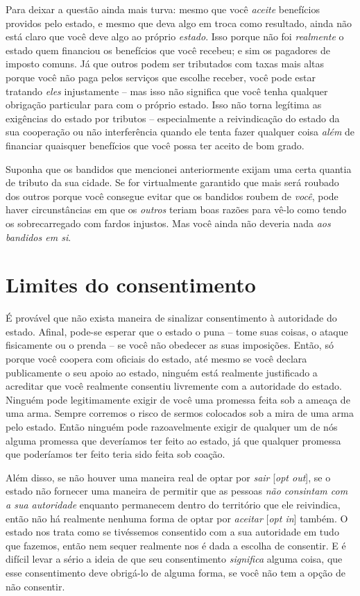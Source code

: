 Para deixar a questão ainda mais turva: mesmo que você \emph{aceite} benefícios providos pelo estado, e mesmo que deva algo em troca como resultado, ainda não está claro que você deve algo ao próprio \emph{estado}. Isso porque não foi \emph{realmente} o estado quem financiou os benefícios que você recebeu; e sim os pagadores de imposto comuns. Já que outros podem ser tributados com taxas mais altas porque você não paga pelos serviços que escolhe receber, você pode estar tratando \emph{eles} injustamente -- mas isso não significa que você tenha qualquer obrigação particular para com o próprio estado. Isso não torna legítima as exigências do estado por tributos -- especialmente a reivindicação do estado da sua cooperação ou não interferência quando ele tenta fazer qualquer coisa \emph{além} de financiar quaisquer benefícios que você possa ter aceito de bom grado.

Suponha que os bandidos que mencionei anteriormente exijam uma certa quantia de tributo da sua cidade. Se for virtualmente garantido que mais será roubado dos outros porque você consegue evitar que os bandidos roubem de \emph{você}, pode haver circunstâncias em que os \emph{outros} teriam boas razões para vê-lo como tendo os sobrecarregado com fardos injustos. Mas você ainda não deveria nada \emph{aos bandidos em si}.

\section{Limites do consentimento}

É provável que não exista maneira de sinalizar consentimento à autoridade do estado. Afinal, pode-se esperar que o estado o puna -- tome suas coisas, o ataque fisicamente ou o prenda -- se você não obedecer as suas imposições. Então, só porque você coopera com oficiais do estado, até mesmo se você declara publicamente o seu apoio ao estado, ninguém está realmente justificado a acreditar que você realmente consentiu livremente com a autoridade do estado. Ninguém pode legitimamente exigir de você uma promessa feita sob a ameaça de uma arma. Sempre corremos o risco de sermos colocados sob a mira de uma arma pelo estado. Então ninguém pode razoavelmente exigir de qualquer um de nós alguma promessa que deveríamos ter feito ao estado, já que qualquer promessa que poderíamos ter feito teria sido feita sob coação.

Além disso, se não houver uma maneira real de optar por \emph{sair} [\emph{opt out}], se o estado não fornecer uma maneira de permitir que as pessoas \emph{não consintam com a sua autoridade} enquanto permanecem dentro do território que ele reivindica, então não há realmente nenhuma forma de optar por \emph{aceitar} [\emph{opt in}] também. O estado nos trata como se tivéssemos consentido com a sua autoridade em tudo que fazemos, então nem sequer realmente nos é dada a escolha de consentir. E é difícil levar a sério a ideia de que seu consentimento \emph{significa} alguma coisa, que esse consentimento deve obrigá-lo de alguma forma, se você não tem a opção de não consentir.

